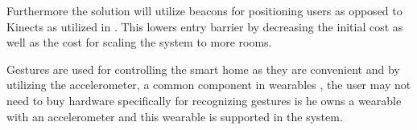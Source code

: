Furthermore the solution will utilize beacons for positioning users as opposed to Kinects as utilized in \cite{caon2011context}. This lowers entry barrier by decreasing the initial cost as well as the cost for scaling the system to more rooms.

Gestures are used for controlling the smart home as they are convenient and by utilizing the accelerometer, a common component in wearables \cite[pp. 3-4]{prespecialisation}, the user may not need to buy hardware specifically for recognizing gestures is he owns a wearable with an accelerometer and this wearable is supported in the system.



